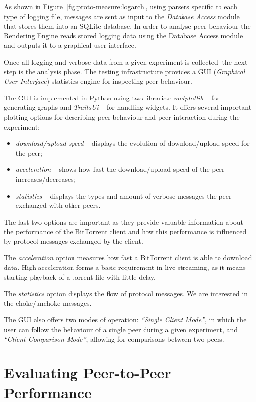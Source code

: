 As shown in Figure~\ref{fig:proto-measure:logarch}, using parsers specific to
each type of logging file, messages are sent as input to the \textit{Database
Access} module that stores them into an SQLite database. In order to analyse
peer behaviour the Rendering Engine reads stored logging data using the
Database Access module and outputs it to a graphical user interface.

Once all logging and verbose data from a given experiment is collected, the
next step is the analysis phase. The testing infrastructure provides a GUI
(\textit{Graphical User Interface}) statistics engine for inspecting peer
behaviour. 

The GUI is implemented in Python using two libraries: \textit{matplotlib}
-- for generating graphs and \textit{TraitsUi} -- for handling widgets. It
offers several important plotting options for describing peer behaviour and
peer interaction during the experiment:

\begin{itemize}
  \item \textit{download/upload speed} -- displays the evolution of
download/upload speed for the peer;
  \item \textit{acceleration} -- shows how fast the download/upload speed of
the peer increases/decreases;
  \item \textit{statistics} -- displays the types and amount of verbose
messages the peer exchanged with other peers.
\end{itemize}

The last two options are important as they provide valuable information about
the performance of the BitTorrent client and how this performance is
influenced by protocol messages exchanged by the client.

The \textit{acceleration} option measures how fast a BitTorrent client is able
to download data. High acceleration forms a basic requirement in live
streaming, as it means starting playback of a torrent file with little delay.

The \textit{statistics} option displays the flow of protocol messages. We are
interested in the choke/unchoke messages.

The GUI also offers two modes of operation: \textit{``Single Client Mode''},
in which the user can follow the behaviour of a single peer during a given
experiment, and \textit{``Client Comparison Mode''}, allowing for comparisons
between two peers.

\section{Evaluating Peer-to-Peer Performance}
\label{sec:eval-swarm}

